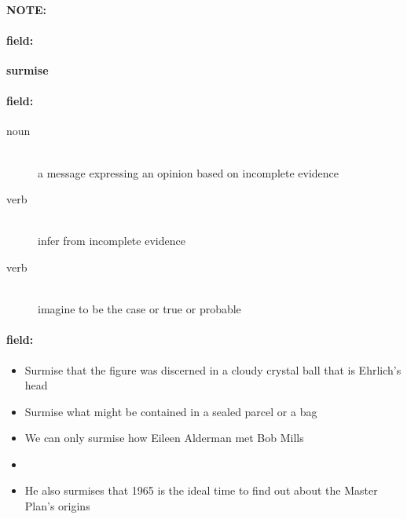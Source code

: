 \documentclass[12pt]{article}
\newenvironment{note}{\paragraph{NOTE:}}{}
\newenvironment{field}{\paragraph{field:}}{}
\begin{document}
\begin{note}
\begin{field}
\textbf{\large surmise}
\end{field}


\begin{field}
\begin{description}
\item[noun] \hfill \\ 
a message expressing an opinion based on incomplete evidence

\item[verb] \hfill \\ 
infer from incomplete evidence

\item[verb] \hfill \\ 
imagine to be the case or true or probable

\end{description}
\end{field}

\begin{field}
\begin{itemize}
\item Surmise that the figure was discerned in a cloudy crystal ball that is Ehrlich's head
\item Surmise what might be contained in a sealed parcel or a bag
\item We can only surmise how Eileen Alderman met Bob Mills
\item 
\item He also surmises that 1965 is the ideal time to find out about the Master Plan's origins
\end{itemize}
\end{field}
\end{note}
\end{document}
